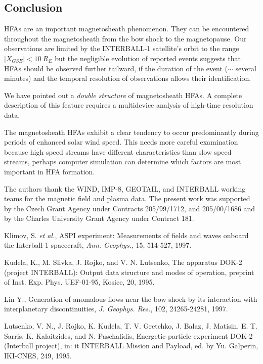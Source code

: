 \begin{article}
\section{Conclusion}
HFAs are an important magnetosheath phenomenon.
They can be encountered throughout the
magnetosheath from the bow shock to the magnetopause. Our
observations are limited by the INTERBALL-1 satellite's orbit to the
range $|X_{GSE}| < 10\> R_E$ but the negligible evolution of reported
events suggests that HFAs should be observed further tailward, if the
duration of the event ($\sim$ several minutes) and the temporal
resolution of observations allows their identification.

We have pointed out a {\it double structure} of magnetosheath
HFAs. A complete description of this feature requires a
multidevice analysis of high-time resolution data.

The magnetosheath HFAs exhibit a clear tendency to occur
predominantly during periods of enhanced solar wind speed.
This needs more careful examination because high speed streams
have different characteristics than slow speed streams,
perhaps computer simulation can determine which factors are
most important in HFA formation.

\acknowledgments %
{The authors thank the WIND, IMP-8, GEOTAIL, and INTERBALL working
teams for the
magnetic field and plasma data. The  present  work  was  supported by
the Czech  Grant  Agency  under  Contracts  205/99/1712, and
205/00/1686 and by the Charles University Grant Agency under
Contract 181.}

\begin{references}

{}
Klimov, S. {\it et al.}, ASPI experiment: Measurements of fields and
waves onboard the Interball-1 spacecraft, {\it Ann. Geophys.}, 15,
514-527, 1997.

Kudela, K., M. Slivka, J. Rojko, and V. N. Lutsenko, The
apparatus DOK-2 (project INTERBALL): Output data structure and
modes of operation, preprint of Inst. Exp. Phys. UEF-01-95,
Kosice, 20, 1995.

Lin Y., Generation of anomalous flows near the bow shock by
its interaction with interplanetary discontinuities, {\it J. Geophys.
Res.}, 102, 24265-24281, 1997.

Lutsenko, V. N., J. Rojko, K. Kudela, T. V. Gretchko, J. Balaz,
J. Matisin, E. T. Sarris, K. Kalaitzides, and N. Paschalidis,
Energetic particle experiment DOK-2 (Interball project), in:
{it INTERBALL Mission and Payload,} ed. by Yu. Galperin, IKI-CNES,
249, 1995.


\end{references}
\end{article}
